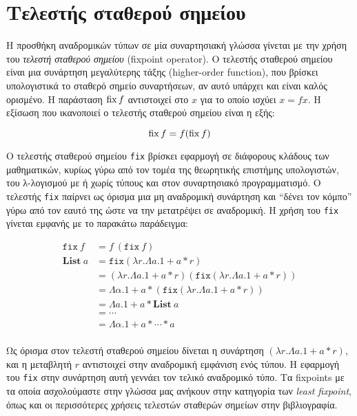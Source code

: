 
\section{Τελεστής σταθερού σημείου}

Η προσθήκη αναδρομικών τύπων σε μία συναρτησιακή γλώσσα γίνεται με την χρήση
του \emph{τελεστή σταθερού σημείου} (fixpoint operator).  Ο τελεστής σταθερού
σημείου είναι μια συνάρτηση μεγαλύτερης τάξης (higher-order function), που
βρίσκει υπολογιστικά το σταθερό σημείο συναρτήσεων, αν αυτό υπάρχει και είναι
καλός ορισμένο. Η παράσταση $\operatorname{fix} f$ αντιστοιχεί στο $x$ για το οποίο ισχύει
$x = f x$.  Η εξίσωση που ικανοποιεί ο τελεστής σταθερού σημείου είναι η εξής:

\begin{displaymath} \operatorname{fix} f = f (\operatorname{fix} f) \end{displaymath}

Ο τελεστής σταθερού σημείου \texttt{fix} βρίσκει εφαρμογή σε διάφορους κλάδους
των μαθηματικών, κυρίως γύρω από τον τομέα της θεωρητικής επιστήμης
υπολογιστών, του λ-λογισμού με ή χωρίς τύπους και στον συναρτησιακό
προγραμματισμό. Ο τελεστής \texttt{fix} παίρνει ως όρισμα μια μη αναδρομική
συνάρτηση και ``δένει τον κόμπο'' γύρω από τον εαυτό της ώστε να την μετατρέψει
σε αναδρομική.  Η χρήση του \texttt{fix} γίνεται εμφανής με το παρακάτω
παράδειγμα:

\begin{align*} \texttt{fix} \ f &= f \ (\texttt{fix} \ f)   \\ \textbf{List} ~a
  &= \texttt{fix} (\lambda r . \Lambda a. 1 + a * r) \\ &= (\lambda r. \Lambda
  a. 1 + a * r) (\texttt{fix} (\lambda r. \Lambda a. 1 + a * r))  \\ &= \Lambda
  \alpha. 1 + a*(\texttt{fix} (\lambda r. \Lambda a. 1 + a * r)) \\ &= \Lambda
a. 1 + a * \textbf{List} ~a \\ &= \cdots \\ &= \Lambda \alpha. 1+ a * \cdots *
a \\ \end{align*}

Ως όρισμα στον τελεστή σταθερού σημείου δίνεται η συνάρτηση $(\lambda r.
\Lambda a. 1 + a *r)$, και η μεταβλητή $r$ αντιστοιχεί στην αναδρομική εμφάνιση
ενός τύπου. Η εφαρμογή του \texttt{fix} στην συνάρτηση αυτή γεννάει τον τελικό
αναδρομικό τύπο. Τα fixpoints με τα οποία ασχολούμαστε στην γλώσσα μας ανήκουν
στην κατηγορία των \emph{least fixpoint}, όπως και οι περισσότερες χρήσεις
τελεστών σταθερών σημείων στην βιβλιογραφία.

